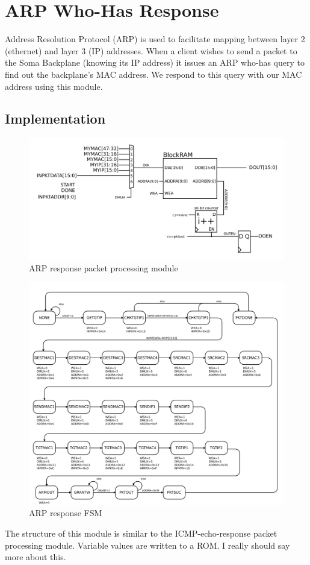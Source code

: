 \section{ARP Who-Has Response}

Address Resolution Protocol (ARP) is used to facilitate mapping
between layer 2 (ethernet) and layer 3 (IP) addresses. When a client
wishes to send a packet to the Soma Backplane (knowing its IP address)
it issues an ARP who-has query to find out the backplane's MAC
address. We respond to this query with our MAC address using this
module.

\subsection{Implementation}
\begin{figure}
\begin{centering}
\includegraphics[scale=0.8]{arpresponse.svg}
\end{centering}
\caption{ARP response packet processing module}
\label{arpresponse}
\end{figure}

\begin{figure}
\begin{centering}
\includegraphics[scale=0.8]{arpresponse.fsm.svg}
\end{centering}
\caption{ARP response FSM}
\label{arpresponse.fsm}
\end{figure}

The structure of this module is similar to the ICMP-echo-response
packet processing module. Variable values are written to a ROM. I
really should say more about this.
